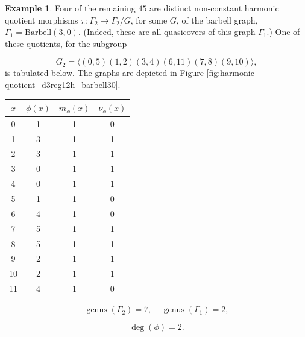 \documentclass[12pt,letterpaper]{article}
\theoremstyle{definition}
\newtheorem{example}[theorem]{Example}
\DeclareMathOperator{\genus}{genus}
\begin{document}
\begin{example}
{Four of the remaining $45$ are distinct non-constant harmonic quotient
morphisms $\pi: \Gamma_2\to \Gamma_2/G$, for some $G$, of the barbell
graph, $\Gamma_1=\mathrm{Barbell}(3,0)$.
(Indeed, these are all quasicovers of this graph $\Gamma_1$.)
One of these quotients, for the subgroup

\[
G_2=\langle (0,5)(1,2)(3,4)(6,11)(7,8)(9,10) \rangle,
\]
is tabulated below. The graphs are depicted in
Figure \ref{fig:harmonic-quotient_d3reg12h+barbell30}.


\begin{center}
\begin{tabular}{c|c|c|c}  
  $x$ & $\phi(x)$ & $m_\phi(x)$ & $\nu_\phi(x)$ \\ \hline
  0   &    1   &        1         &  0   \\ 
  1   &    3   &        1         &  1   \\ 
  2   &    3   &        1         &  1   \\ 
  3   &    0   &        1         &  1   \\ 
  4   &    0   &        1         &  1   \\ 
  5   &    1   &        1         &  0    \\ 
  6   &    4   &        1         &  0   \\ 
  7   &    5   &        1         &  1   \\
  8   &    5   &        1         &  1   \\
  9   &    2   &        1         &  1   \\
  10  &    2   &        1         &  1   \\
  11  &    4   &        1         &  0   \\ 
\end{tabular}
\end{center}

\[
  \genus(\Gamma_2) =7,\ \ \ \ \
  \genus(\Gamma_1) =2,
\]

\[
\deg(\phi) =2.
\]

}
\end{example}
\end{document}
